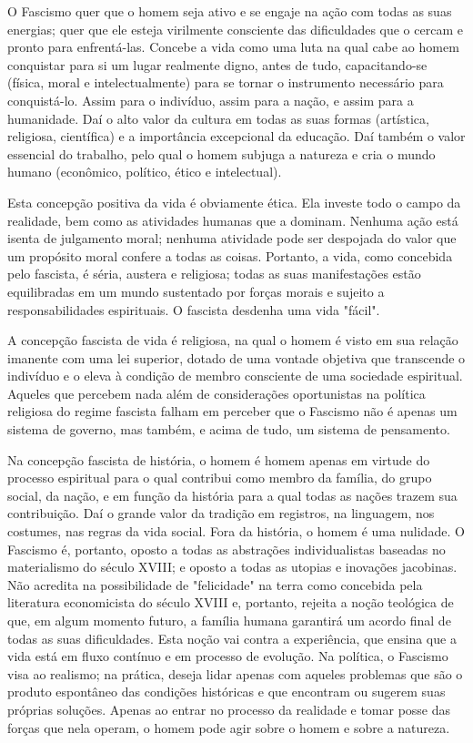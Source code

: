 \documentclass[12pt]{article}
\begin{document}
O Fascismo quer que o homem seja ativo e se engaje na ação com todas as suas energias; quer que ele esteja virilmente consciente das dificuldades que o cercam e pronto para enfrentá-las. Concebe a vida como uma luta na qual cabe ao homem conquistar para si um lugar realmente digno, antes de tudo, capacitando-se (física, moral e intelectualmente) para se tornar o instrumento necessário para conquistá-lo. Assim para o indivíduo, assim para a nação, e assim para a humanidade. Daí o alto valor da cultura em todas as suas formas (artística, religiosa, científica) e a importância excepcional da educação. Daí também o valor essencial do trabalho, pelo qual o homem subjuga a natureza e cria o mundo humano (econômico, político, ético e intelectual).

Esta concepção positiva da vida é obviamente ética. Ela investe todo o campo da realidade, bem como as atividades humanas que a dominam. Nenhuma ação está isenta de julgamento moral; nenhuma atividade pode ser despojada do valor que um propósito moral confere a todas as coisas. Portanto, a vida, como concebida pelo fascista, é séria, austera e religiosa; todas as suas manifestações estão equilibradas em um mundo sustentado por forças morais e sujeito a responsabilidades espirituais. O fascista desdenha uma vida "fácil".

A concepção fascista de vida é religiosa, na qual o homem é visto em sua relação imanente com uma lei superior, dotado de uma vontade objetiva que transcende o indivíduo e o eleva à condição de membro consciente de uma sociedade espiritual. Aqueles que percebem nada além de considerações oportunistas na política religiosa do regime fascista falham em perceber que o Fascismo não é apenas um sistema de governo, mas também, e acima de tudo, um sistema de pensamento.

Na concepção fascista de história, o homem é homem apenas em virtude do processo espiritual para o qual contribui como membro da família, do grupo social, da nação, e em função da história para a qual todas as nações trazem sua contribuição. Daí o grande valor da tradição em registros, na linguagem, nos costumes, nas regras da vida social. Fora da história, o homem é uma nulidade. O Fascismo é, portanto, oposto a todas as abstrações individualistas baseadas no materialismo do século XVIII; e oposto a todas as utopias e inovações jacobinas. Não acredita na possibilidade de "felicidade" na terra como concebida pela literatura economicista do século XVIII e, portanto, rejeita a noção teológica de que, em algum momento futuro, a família humana garantirá um acordo final de todas as suas dificuldades. Esta noção vai contra a experiência, que ensina que a vida está em fluxo contínuo e em processo de evolução. Na política, o Fascismo visa ao realismo; na prática, deseja lidar apenas com aqueles problemas que são o produto espontâneo das condições históricas e que encontram ou sugerem suas próprias soluções. Apenas ao entrar no processo da realidade e tomar posse das forças que nela operam, o homem pode agir sobre o homem e sobre a natureza.
\end{document}
